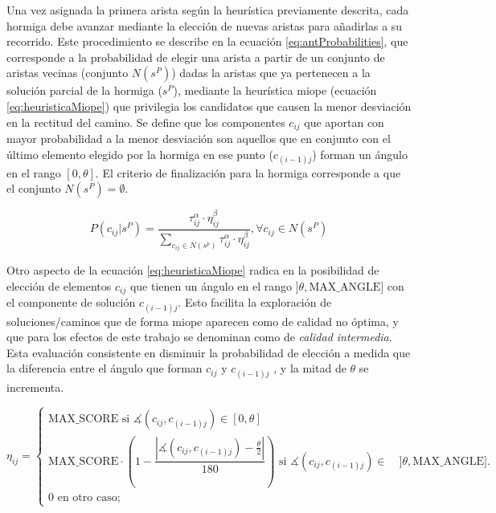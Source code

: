 Una vez asignada la primera arista seg\'un la heur\'istica previamente descrita, cada hormiga debe avanzar mediante la elecci\'on de nuevas aristas para a\~nadirlas a su recorrido. Este procedimiento se describe en la ecuaci\'on \eqref{eq:antProbabilities}, que corresponde a la probabilidad de elegir una arista a partir de un conjunto de aristas vecinas (conjunto $N(s^{P})$) dadas la aristas que ya pertenecen a la soluci\'on parcial de la hormiga ($s^P$), mediante la heur\'istica miope (ecuaci\'on \eqref{eq:heuristicaMiope}) que privilegia los candidatos que causen la menor desviaci\'on en la rectitud del camino. Se define que los componentes $c_{ij}$ que aportan con mayor probabilidad a la menor desviaci\'on son aquellos que en conjunto con el \'ultimo elemento elegido por la hormiga en ese punto ($c_{(i-1)j}$) forman un \'angulo en el rango $[0, \theta]$. El criterio de finalizaci\'on para la hormiga corresponde a que el conjunto $N(s^{P}) = \emptyset$.

\begin{equation}
P(c_{ij} | s^{P}) = \frac
        {\tau_{ij}^{\alpha} \cdot \eta_{ij}^{\beta}}
        {\sum\limits_{c_{ij}\in N(s^p)}{\tau_{ij}^{\alpha} \cdot \eta_{ij}^{\beta} } }, \forall c_{ij} \in N(s^{P})
\label{eq:antProbabilities}
\end{equation}

Otro aspecto de la ecuaci\'on \eqref{eq:heuristicaMiope} radica en la posibilidad de elecci\'on de elementos $c_{ij}$ que tienen un \'angulo en el rango $]\theta, \text{MAX\_ANGLE}]$ con el componente de soluci\'on $c_{(i-1)j}$. Esto facilita la exploraci\'on de soluciones/caminos que de forma miope aparecen como de calidad no \'optima, y que para los efectos de este trabajo se denominan como de {\it calidad intermedia}. Esta evaluaci\'on consistente en disminuir la probabilidad de elecci\'on a medida que la diferencia entre el \'angulo que forman $c_{ij}$ y $c_{(i-1)j}$  , y la mitad de $\theta$ se incrementa.



\begin{equation}
    \eta_{ij} = 
        \begin{cases} 
        \text{MAX\_SCORE si } \measuredangle(c_{ij}, c_{(i-1)j}) \in [0, \theta]\\[3ex]
        
        \text{MAX\_SCORE} \cdot \left(1 - \dfrac{ \left| \measuredangle(c_{ij}, c_{(i-1)j}) - \frac{\theta}{2} \right|} {180} \right)  \text{ si } \measuredangle(c_{ij}, c_{(i-1)j}) \in \quad ]\theta, \text{MAX\_ANGLE}].\\[3ex]
        
        \text{0 en otro caso;}
        \end{cases}
    \label{eq:heuristicaMiope}
\end{equation}

